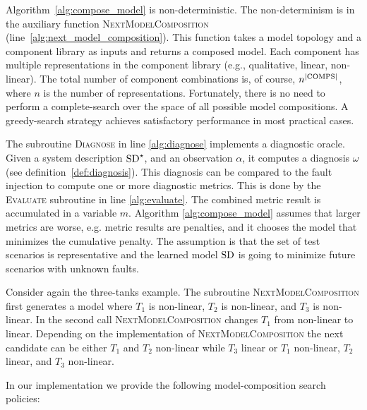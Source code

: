 %
Algorithm~\ref{alg:compose_model} is non-deterministic. The
non-determinism is in the auxiliary function
\textsc{NextModelComposition}
(line~\ref{alg:next_model_composition}). This function takes a model
topology and a component library as inputs and returns a composed
model. Each component has multiple representations in the component
library (e.g., qualitative, linear, non-linear). The total number of
component combinations is, of course, $n^{|\mathrm{COMPS}|}$, where $n$ is the
number of representations. Fortunately, there is no need to perform a
complete-search over the space of all possible model compositions. A
greedy-search strategy achieves satisfactory performance in most
practical cases.
\par
The subroutine \textsc{Diagnose} in line \ref{alg:diagnose} implements
a diagnostic oracle. Given a system description $\mathrm{SD}^\star$, and an
observation $\alpha$, it computes a diagnosis $\omega$ (see
definition~\ref{def:diagnosis}). This diagnosis can be compared to the
fault injection to compute one or more diagnostic metrics. This is
done by the \textsc{Evaluate} subroutine in line
\ref{alg:evaluate}. The combined metric result is accumulated in a variable
$m$. Algorithm \ref{alg:compose_model} assumes that larger metrics are
worse, e.g. metric results are penalties, and it chooses the model
that minimizes the cumulative penalty. The assumption is that the set
of test scenarios is representative and the learned model $\mathrm{SD}$ is
going to minimize future scenarios with unknown faults.
\par
Consider again the three-tanks example. The subroutine
\textsc{NextModelComposition} first generates a model where $T_1$ is
non-linear, $T_2$ is non-linear, and $T_3$ is non-linear. In the second
call \textsc{NextModelComposition} changes $T_1$ from non-linear to
linear. Depending on the implementation of
\textsc{NextModelComposition} the next candidate can be either $T_1$
and $T_2$ non-linear while $T_3$ linear or $T_1$ non-linear, $T_2$
linear, and $T_3$ non-linear.
\par
In our implementation we provide the following model-composition
search policies:
%
